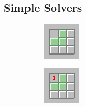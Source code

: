\documentclass[letterpaper]{article}
\begin{document}
\subsection{Simple Solvers}
\begin{figure}[t]
\centering
\begin{subfigure}[b]{0.45\columnwidth}
	\centering
	\includegraphics[width=\columnwidth]{simple constraint 0}
	\caption{\label{fig:simple_safe}}
\end{subfigure}
\begin{subfigure}[b]{0.45\columnwidth}
	\centering
	\includegraphics[width=\columnwidth]{simple constraint 1}

\end{subfigure}
\end{figure}
\end{document}

